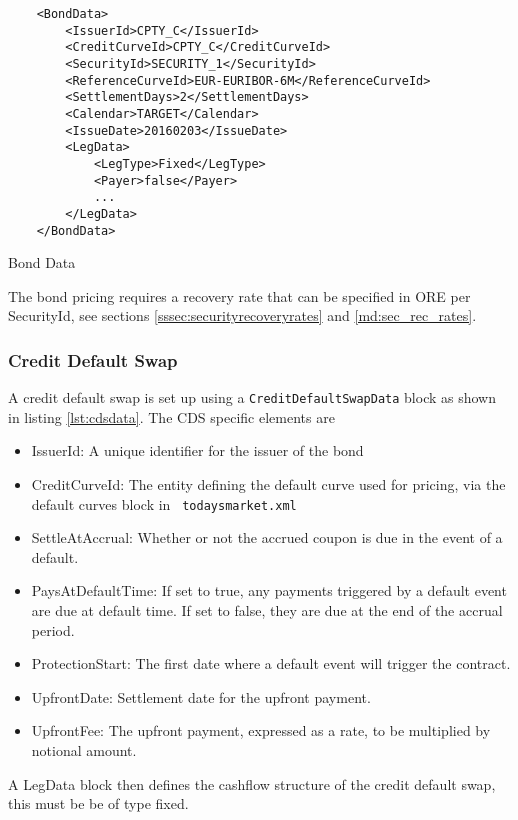 \begin{listing}[H]
\begin{verbatim}
    <BondData>
        <IssuerId>CPTY_C</IssuerId>
        <CreditCurveId>CPTY_C</CreditCurveId>
        <SecurityId>SECURITY_1</SecurityId>
        <ReferenceCurveId>EUR-EURIBOR-6M</ReferenceCurveId>
        <SettlementDays>2</SettlementDays>
        <Calendar>TARGET</Calendar>
        <IssueDate>20160203</IssueDate>
        <LegData>
            <LegType>Fixed</LegType>
            <Payer>false</Payer>
            ...
        </LegData>
    </BondData>
\end{verbatim}
\caption{Bond Data}
\label{lst:bonddata}
\end{listing}

The bond pricing requires a recovery rate that can be specified in ORE per SecurityId, see sections \ref{sssec:securityrecoveryrates} and \ref{md:sec_rec_rates}. 

\subsubsection{Credit Default Swap}

A credit default swap is set up using a {\tt CreditDefaultSwapData} block as shown in listing \ref{lst:cdsdata}. The CDS specific elements
are

\begin{itemize}
\item IssuerId: A unique identifier for the issuer of the bond
\item CreditCurveId: The entity defining the default curve used for pricing, via the default curves block in {\tt
    todaysmarket.xml}
\item SettleAtAccrual: Whether or not the accrued coupon is due in the event of a default.
\item PaysAtDefaultTime: If set to true, any payments triggered by a default event are due at default time. If set to false, they are due at the end of the accrual period.
\item ProtectionStart: The first date where a default event will trigger the contract.
\item UpfrontDate: Settlement date for the upfront payment.
\item UpfrontFee: The upfront payment, expressed as a rate, to be multiplied by notional amount.
\end{itemize}

A LegData block then defines the cashflow structure of the credit default swap, this must be be of type fixed.

